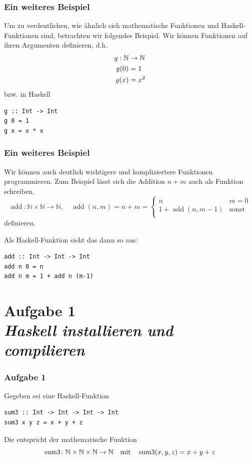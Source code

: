 \documentclass{beamer}
\begin{document}
	\begin{frame}[fragile] \frametitle{Ein weiteres Beispiel}
		\footnotesize
		Um zu verdeutlichen, wie ähnlich sich mathematische Funktionen und Haskell-Funktionen sind, betrachten wir folgendes Beispiel. 
		Wir können Funktionen auf ihren Argumenten definieren, d.h.
		\begin{equation*}
			\begin{aligned}
				g : \mathbb{N} &\to \mathbb{N} \\
				g(0) &= 1 \\
				g(x) &= x^2
			\end{aligned}
		\end{equation*}
		bzw. in Haskell
		\begin{lstlisting}[style=bg]
g :: Int -> Int
g 0 = 1
g x = x * x
		\end{lstlisting}
	\end{frame}

	\begin{frame}[fragile] \frametitle{Ein weiteres Beispiel}
		\footnotesize
		Wir können auch deutlich wichtigere und kompliziertere Funktionen programmieren. Zum Beispiel lässt sich die Addition $n+m$ auch als Funktion schreiben.
		\begin{equation*}
			\operatorname{add} : \mathbb{N} \times \mathbb{N} \to \mathbb{N}, \quad
			\operatorname{add}(n,m) = n + m = 
			\begin{cases}
				n & m = 0 \\
				1 + \operatorname{add} ( n , m-1 ) &\text{sonst} \\
			\end{cases}
		\end{equation*}
		definieren.
		
		\medskip \pause
		
		Als Haskell-Funktion sieht das dann so aus:
		\begin{lstlisting}[style=bg]
add :: Int -> Int -> Int
add n 0 = n
add n m = 1 + add n (m-1)
		\end{lstlisting}
	\end{frame}
	
	
	\section{Aufgabe 1 \\ \textit{\normalsize Haskell installieren und compilieren}}

	\begin{frame}[fragile] \frametitle{Aufgabe 1}
		Gegeben sei eine Haskell-Funktion
		\begin{lstlisting}[style=bg]
sum3 :: Int -> Int -> Int -> Int
sum3 x y z = x + y + z
		\end{lstlisting}
	
		\pause
		
		Die entspricht der mathematische Funktion
		\begin{equation*}
			\operatorname{sum3} \colon \mathbb{N} \times \mathbb{N} \times \mathbb{N} \to \mathbb{N} \quad \text{mit} \quad \operatorname{sum3}(x,y,z) = x + y + z
		\end{equation*}
	\end{frame}
\end{document}
